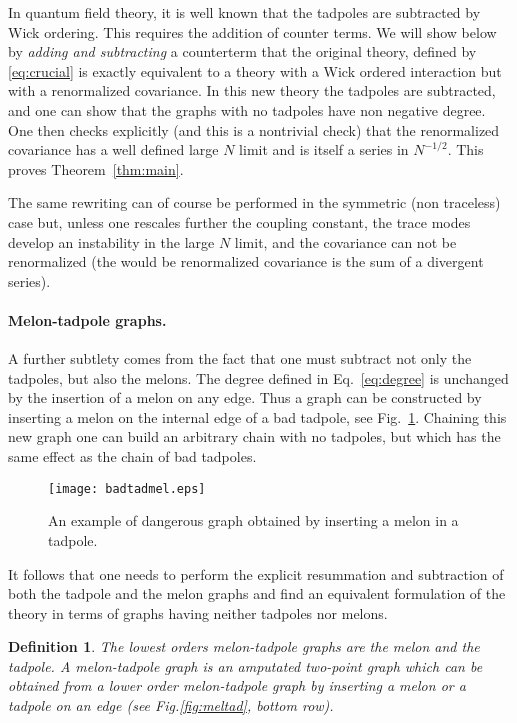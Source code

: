 \documentclass[10pt]{article}
\theoremstyle{plain}
\newtheorem{definition}{Definition}
\theoremstyle{definition}
\begin{document}
In quantum field theory, it is well known that the tadpoles are subtracted by Wick ordering. This requires the addition of counter terms. 
We will show below by \emph{adding and subtracting} a counterterm that the original theory, defined by 
\eqref{eq:crucial} is exactly equivalent to a theory with a Wick ordered interaction but with a renormalized covariance. In this new theory 
the tadpoles are subtracted, and one can show that the graphs with no tadpoles have non negative degree. One then checks explicitly
(and this is a nontrivial check) that the renormalized covariance has a well defined large $N$ limit and is itself a series in $N^{-1/2}$. This proves Theorem~\ref{thm:main}.

The same rewriting can of course be performed in the symmetric (non traceless) case but, unless one rescales further the coupling constant, the trace modes
develop an instability in the large $N$ limit, and the covariance can not be renormalized (the would be renormalized covariance is 
the sum of a divergent series).

\paragraph{Melon-tadpole graphs.} A further subtlety comes from the fact that one must subtract not only the tadpoles, but also the melons. The degree defined in Eq.~\eqref{eq:degree}
is unchanged by the insertion of a melon on any edge. Thus a graph can be constructed by inserting a melon on the internal edge of a 
bad tadpole, see Fig.~\ref{fig:badtadmel}. Chaining this new graph one can build an arbitrary chain with no tadpoles, but which has the same effect as the chain of bad tadpoles.

   \begin{figure}[htb]
 \begin{center}
 \texttt{[image: badtadmel.eps]}  
 \caption{An example of dangerous graph obtained by inserting a melon in a tadpole.}\label{fig:badtadmel}
 \end{center}
 \end{figure}


It follows that one needs to perform the explicit resummation and subtraction of both the tadpole and the melon graphs and 
find an equivalent formulation of the theory in terms of graphs having neither tadpoles nor melons.

\begin{definition}
The lowest orders melon-tadpole graphs are the melon and the tadpole.
A melon-tadpole graph is an amputated two-point graph which can be obtained from 
a lower order melon-tadpole graph by inserting a melon or a tadpole on an edge (see Fig.\ref{fig:meltad}, bottom row). 
\end{definition}
\end{document}
